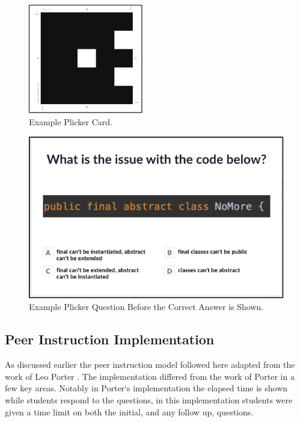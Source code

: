 \documentclass[12pt]{article}
\begin{document}
\begin{figure}[ht]
  \centering
  \includegraphics[width=50mm,scale=0.5]{plicker_card.png}
  \caption{Example Plicker Card.}
  \label{fig:plicker_card}
\end{figure}
\begin{figure}[ht]
  \includegraphics[width=\linewidth]{plicker_question.png}
  \caption{Example Plicker Question Before the Correct Answer is Shown.}
  \label{fig:plicker_question}
\end{figure}



\subsection{Peer Instruction Implementation}

As discussed earlier the peer instruction model followed here adapted from the work of Leo Porter \cite{porterPeerInstructionStudents2011}. The implementation differed from the work of Porter in a few key areas. Notably in Porter`s implementation the elapsed time is shown while students respond to the questions, in this implementation students were given a time limit on both the initial, and any follow up, questions. 
\end{document}
